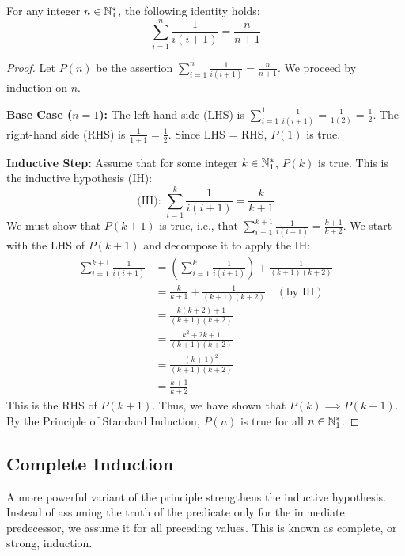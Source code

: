 \begin{proposition}
For any integer $n \in \mathbb{N}_{1}^*$, the following identity holds:
$$ \sum_{i=1}^{n} \frac{1}{i(i+1)} = \frac{n}{n+1} $$
\end{proposition}
\begin{proof}
Let $P(n)$ be the assertion $\sum_{i=1}^{n} \frac{1}{i(i+1)} = \frac{n}{n+1}$. We proceed by induction on $n$.

\textbf{Base Case ($n=1$):}
The left-hand side (LHS) is $\sum_{i=1}^{1} \frac{1}{i(i+1)} = \frac{1}{1(2)} = \frac{1}{2}$.
The right-hand side (RHS) is $\frac{1}{1+1} = \frac{1}{2}$.
Since LHS = RHS, $P(1)$ is true.

\textbf{Inductive Step:}
Assume that for some integer $k \in \mathbb{N}_{1}^*$, $P(k)$ is true. This is the inductive hypothesis (IH):
$$ \text{(IH): } \sum_{i=1}^{k} \frac{1}{i(i+1)} = \frac{k}{k+1} $$
We must show that $P(k+1)$ is true, i.e., that $\sum_{i=1}^{k+1} \frac{1}{i(i+1)} = \frac{k+1}{k+2}$.
We start with the LHS of $P(k+1)$ and decompose it to apply the IH:
\begin{align*}
\sum_{i=1}^{k+1} \frac{1}{i(i+1)} &= \left( \sum_{i=1}^{k} \frac{1}{i(i+1)} \right) + \frac{1}{(k+1)(k+2)} \\
&= \frac{k}{k+1} + \frac{1}{(k+1)(k+2)} \quad (\text{by IH}) \\
&= \frac{k(k+2) + 1}{(k+1)(k+2)} \\
&= \frac{k^2 + 2k + 1}{(k+1)(k+2)} \\
&= \frac{(k+1)^2}{(k+1)(k+2)} \\
&= \frac{k+1}{k+2}
\end{align*}
This is the RHS of $P(k+1)$. Thus, we have shown that $P(k) \implies P(k+1)$.
By the Principle of Standard Induction, $P(n)$ is true for all $n \in \mathbb{N}_{1}^*$.
\end{proof}

\subsection{Complete Induction}

A more powerful variant of the principle strengthens the inductive hypothesis. Instead of assuming the truth of the predicate only for the immediate predecessor, we assume it for all preceding values. This is known as complete, or strong, induction.

